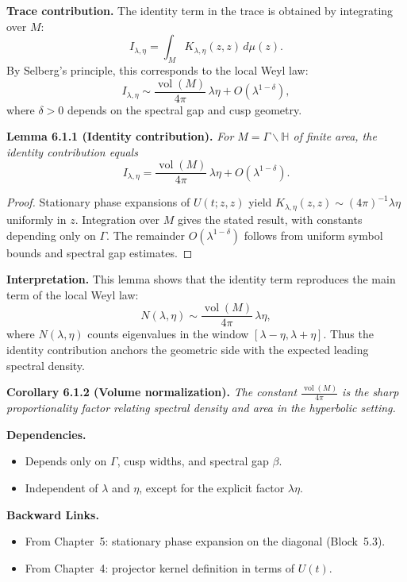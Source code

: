 \noindent\textbf{Trace contribution.}
The identity term in the trace is obtained by integrating over $M$:
\[
  I_{\lambda,\eta} = \int_M K_{\lambda,\eta}(z,z)\, d\mu(z).
\]
By Selberg’s principle, this corresponds to the local Weyl law:
\[
  I_{\lambda,\eta} \sim \frac{\operatorname{vol}(M)}{4\pi}\,\lambda\eta
  + O(\lambda^{1-\delta}),
\]
where $\delta>0$ depends on the spectral gap and cusp geometry.

\medskip

\noindent\textbf{Lemma 6.1.1 (Identity contribution).}
\emph{For $M=\Gamma\backslash \mathbb{H}$ of finite area, the identity contribution equals}
\[
  I_{\lambda,\eta} = \frac{\operatorname{vol}(M)}{4\pi}\,\lambda\eta + O(\lambda^{1-\delta}).
\]

\begin{proof}
Stationary phase expansions of $U(t;z,z)$ yield $K_{\lambda,\eta}(z,z)\sim (4\pi)^{-1}\lambda\eta$ uniformly in $z$.  
Integration over $M$ gives the stated result, with constants depending only on $\Gamma$.  
The remainder $O(\lambda^{1-\delta})$ follows from uniform symbol bounds and spectral gap estimates.
\end{proof}

\medskip

\noindent\textbf{Interpretation.}
This lemma shows that the identity term reproduces the main term of the local Weyl law:
\[
  N(\lambda,\eta) \sim \frac{\operatorname{vol}(M)}{4\pi}\,\lambda\eta,
\]
where $N(\lambda,\eta)$ counts eigenvalues in the window $[\lambda-\eta,\lambda+\eta]$.  
Thus the identity contribution anchors the geometric side with the expected leading spectral density.

\medskip

\noindent\textbf{Corollary 6.1.2 (Volume normalization).}
\emph{The constant $\tfrac{\operatorname{vol}(M)}{4\pi}$ is the sharp proportionality factor  
relating spectral density and area in the hyperbolic setting.}

\medskip

\noindent\textbf{Dependencies.}
\begin{itemize}
  \item Depends only on $\Gamma$, cusp widths, and spectral gap $\beta$.
  \item Independent of $\lambda$ and $\eta$, except for the explicit factor $\lambda\eta$.
\end{itemize}

\medskip

\noindent\textbf{Backward Links.}
\begin{itemize}
  \item From Chapter~5: stationary phase expansion on the diagonal (Block~5.3).
  \item From Chapter~4: projector kernel definition in terms of $U(t)$.
\end{itemize}

